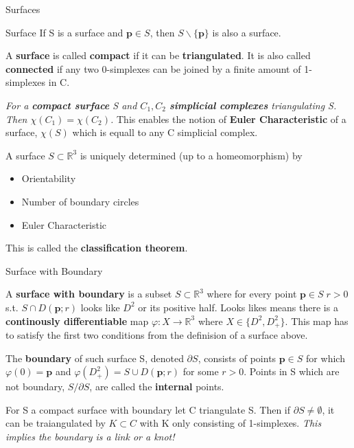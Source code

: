\documentclass[12pt, letterpaper]{article}
\begin{document}
\begin{section}{Surfaces}
\begin{subsection}{Surface}
    If S is a surface and \(\textbf{p} \in S\), then \(S \backslash{}
    \{{} \textbf{p} \}{}\) is also a surface.

    A \textbf{surface} is called \textbf{compact} if it can be
    \textbf{triangulated}.
    It is also called \textbf{connected} if any two 0-simplexes can be joined by
    a finite amount of 1-simplexes in C.

    \emph{For a \textbf{compact surface} S and \(C_{1}, C_{2}\) \textbf{simplicial
        complexes} triangulating S. Then \(\chi(C_{1}) = \chi(C_{2})\).} This
    enables the notion of \textbf{Euler Characteristic} of a surface, \(\chi(S)\)
    which is equall to any C simplicial complex.

    A surface \(S \subset \mathbb{R}^{3}\) is uniquely determined
    (up to a homeomorphism) by
    \begin{itemize}
      \item Orientability
      \item Number of boundary circles
      \item Euler Characteristic
    \end{itemize}
    This is called the \textbf{classification theorem}.

  \end{subsection}

  \begin{subsection}{Surface with Boundary}

    A \textbf{surface with boundary} is a subset \(S \subset \mathbb{R}^{3}\)
    where for every point \(\textbf{p} \in S \; r > 0\) s.t.
    \(S \cap D(\textbf{p}; r)\) looks like \(D^{2}\) or its positive half.
    Looks likes means there is a \textbf{continously differentiable} map
    \(\varphi: X \to \mathbb{R}^{3}\) where \(X \in \{ D^{2}, D^{2}_{+} \}\).
    This map has to satisfy the first two conditions from the definision of a
    surface above.

    The \textbf{boundary} of such surface S, denoted \(\partial S\), consists of
    points \(\textbf{p} \in S\) for which \(\varphi(0) = \textbf{p}\) and
    \(\varphi(D^{2}_{+}) = S \cup D(\textbf{p}; r)\) for some \(r > 0\).
    Points in S which are not boundary, \(S/\partial S\), are called the
    \textbf{internal} points.

    For S a compact surface with boundary let C triangulate S. Then if
    \(\partial S \neq \emptyset\), it can be traiangulated by \(K \subset C\)
    with K only consisting of 1-simplexes. \emph{This implies the boundary is
    a link or a knot!}


\end{subsection}
\end{section}
\end{document}
